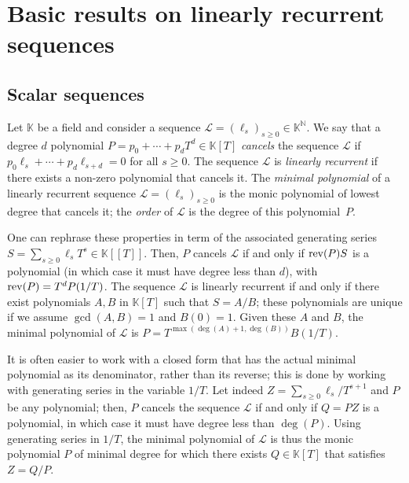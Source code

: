 \documentclass[12pt]{article}
\newcommand{\genseries}{Z}
\newcommand{\minpoly}{P}
\def\N {\ensuremath{\mathbb{N}}}
\def\K{\mathbb{K}}
\def\K {\ensuremath{\mathbb{K}}}
\begin{document}
\section{Basic results on linearly recurrent sequences}


\subsection{Scalar sequences} \label{section:linseq}

Let $\K$ be a field and consider a sequence $\mathcal{L}=(\ell_s)_{s
  \ge 0} \in \K^\N$. We say that a degree $d$ polynomial $\minpoly =
p_0 + \cdots + p_d T^d \in\K[T]$ {\em cancels} the sequence
$\mathcal{L}$ if $p_0 \ell_s + \cdots + p_d \ell_{s+d}=0$ for all $s
\ge 0$. The sequence $\mathcal{L}$ is {\em linearly recurrent} if
there exists a non-zero polynomial that cancels it.  The {\em minimal
  polynomial} of a linearly recurrent sequence
$\mathcal{L}=(\ell_s)_{s \ge 0}$ is the monic polynomial of lowest
degree that cancels it; the {\em order} of $\mathcal{L}$ is the degree
of this polynomial~$\minpoly$.

One can rephrase these properties in term of the associated generating
series $S=\sum_{s \ge 0} \ell_s T^s \in \K[[T]]$.  Then, $\minpoly$
cancels $\mathcal{L}$ if and only if ${\rm rev}(\minpoly) S$ is a
polynomial (in which case it must have degree less than $d$), with
${\rm rev}(\minpoly)=T^d \minpoly(1/T)$.  The sequence $\mathcal{L}$ 
is linearly recurrent if and only if there
exist polynomials $A,B$ in $\K[T]$ such that $S=A/B$; these
polynomials are unique if we assume $\gcd(A,B)=1$ and $B(0)=1$.  Given
these $A$ and $B$, the minimal polynomial of $\mathcal{L}$ is
$\minpoly = T^{\max(\deg(A)+1,\deg(B))}B(1/T)$. 

It is often easier to work with a closed form that has the actual
minimal polynomial as its denominator, rather than its reverse; this
is done by working with generating series in the variable $1/T$.  Let
indeed $\genseries = \sum_{s\ge0} \ell_s / T^{s+1}$ and $\minpoly$
be any polynomial; then, $\minpoly$ cancels the sequence $\mathcal{L}$
if and only if $Q=\minpoly \genseries $ is a polynomial, in which case it
must have degree less than $\deg(\minpoly)$.  Using generating series in
$1/T$, the minimal polynomial of $\mathcal{L}$ is thus the
monic polynomial $\minpoly$ of minimal degree for which there exists $Q \in
\K[T]$ that satisfies $\genseries=Q/\minpoly$.
\end{document}
